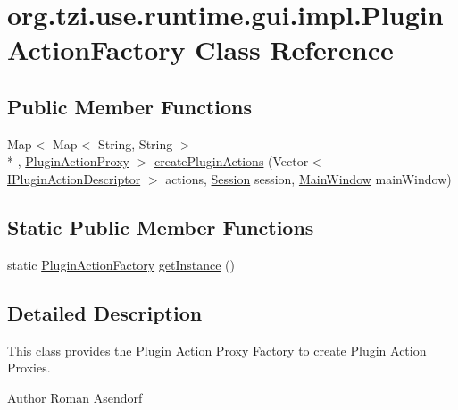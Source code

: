 \hypertarget{classorg_1_1tzi_1_1use_1_1runtime_1_1gui_1_1impl_1_1_plugin_action_factory}{\section{org.\-tzi.\-use.\-runtime.\-gui.\-impl.\-Plugin\-Action\-Factory Class Reference}
\label{classorg_1_1tzi_1_1use_1_1runtime_1_1gui_1_1impl_1_1_plugin_action_factory}
}
\subsection*{Public Member Functions}
\begin{DoxyCompactItemize}
\item 
Map$<$ Map$<$ String, String $>$\\*
, \hyperlink{classorg_1_1tzi_1_1use_1_1runtime_1_1gui_1_1impl_1_1_plugin_action_proxy}{Plugin\-Action\-Proxy} $>$ \hyperlink{classorg_1_1tzi_1_1use_1_1runtime_1_1gui_1_1impl_1_1_plugin_action_factory_a4a7788c9f60e6b9a525766b11bdbe04f}{create\-Plugin\-Actions} (Vector$<$ \hyperlink{interfaceorg_1_1tzi_1_1use_1_1runtime_1_1gui_1_1_i_plugin_action_descriptor}{I\-Plugin\-Action\-Descriptor} $>$ actions, \hyperlink{classorg_1_1tzi_1_1use_1_1main_1_1_session}{Session} session, \hyperlink{classorg_1_1tzi_1_1use_1_1gui_1_1main_1_1_main_window}{Main\-Window} main\-Window)
\end{DoxyCompactItemize}
\subsection*{Static Public Member Functions}
\begin{DoxyCompactItemize}
\item 
static \hyperlink{classorg_1_1tzi_1_1use_1_1runtime_1_1gui_1_1impl_1_1_plugin_action_factory}{Plugin\-Action\-Factory} \hyperlink{classorg_1_1tzi_1_1use_1_1runtime_1_1gui_1_1impl_1_1_plugin_action_factory_a42a83445d26fadbafa87ec3213c927a3}{get\-Instance} ()
\end{DoxyCompactItemize}


\subsection{Detailed Description}
This class provides the Plugin Action Proxy Factory to create Plugin Action Proxies.

\begin{DoxyAuthor}{Author}
Roman Asendorf 
\end{DoxyAuthor}


